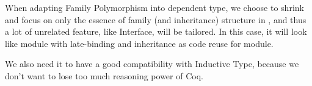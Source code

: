 When adapting Family Polymorphism into dependent type, we choose to shrink and focus on only the essence of family (and inheritance) structure in \citet{zm2017}, and thus a lot of unrelated feature, like Interface, will be tailored. In this case, it will look like module with late-binding and inheritance as code reuse for module. 

We also need it to have a good compatibility with Inductive Type, because we don't want to lose too much reasoning power of Coq. 

